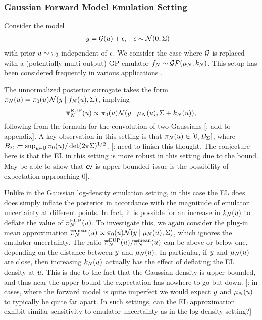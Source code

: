 \documentclass[12pt]{article}
\begin{document}
\subsubsection{Gaussian Forward Model Emulation Setting} \label{sec:fwd-Gaussian} 
Consider the model
\begin{align}
&y = \mathcal{G}(u) + \epsilon, &&\epsilon \sim \mathcal{N}(0, \Sigma)
\end{align}
with prior $u \sim \pi_0$ independent of $\epsilon$. We consider the case 
where $\mathcal{G}$ is replaced with a (potentially multi-output) GP emulator 
$f_{N} \sim \mathcal{GP}(\mu_{N}, k_{N})$. This setup has been considered frequently in various 
applications \citep{Surer2023sequential,weightedIVAR,StuartTeck2,GP_PDE_priors,CES,
idealizedGCM,villani2024posteriorsamplingadaptivegaussian,hydrologicalModel,hydrologicalModel2}.

The unnormalized posterior surrogate takes the form 
$\pi_{N}(u) = \pi_0(u)\mathcal{N}(y \mid f_{N}(u), \Sigma)$, implying
\begin{equation}
\overline{\pi}_{N}^{\mathrm{EUP}}(u) \propto \pi_0(u) \mathcal{N}(y \mid \mu_{N}(u), \Sigma + k_{N}(u)),
\label{eq:EL-Gaussian-fwd}
\end{equation}
following from the formula for the convolution of two Gaussians [\todo: add to appendix].
A key observation in this setting is that $\pi_{N}(u) \in [0, B_{\Sigma}]$, where 
$B_{\Sigma} \coloneqq \sup_{u \in \mathsf{U}} \pi_0(u) / \det(2\pi\Sigma)^{1/2}$.
[\todo: need to finish this thought. The conjecture here is that the EL in this setting is 
more robust in this setting due to the bound. May be able to show that $\mathsf{cv}$ is upper
bounded--issue is the possibility of expectation approaching 0].

Unlike in the Gaussian log-density emulation setting, in this case the EL does does simply 
inflate the posterior in accordance with the magnitude of emulator uncertainty at different points.
In fact, it is possible for an increase in $k_{N}(u)$ to deflate the value of $\overline{\pi}_{N}^{\mathrm{EUP}}(u)$.
To investigate this, we again consider the plug-in mean approximation
$\overline{\pi}_{N}^{\mathrm{mean}}(u) \propto \pi_0(u) \mathcal{N}(y \mid \mu_{N}(u), \Sigma)$,
which ignores the emulator uncertainty. The ratio 
$\overline{\pi}_{N}^{\mathrm{EUP}}(u)/\overline{\pi}_{N}^{\mathrm{mean}}(u)$ can be above 
or below one, depending on the distance between $y$ and $\mu_{N}(u)$. In particular,
if $y$ and $\mu_{N}(u)$ are close, then increasing $k_{N}(u)$ actually has the effect
of deflating the EL density at $u$. This is due to the fact that the Gaussian density is 
upper bounded, and thus near the upper bound the expectation has nowhere to go but down.
[\todo: in cases, where the forward model is quite imperfect we would expect $y$ and $\mu_{N}(u)$
to typically be quite far apart. In such settings, can the EL approximation exhibit similar sensitivity to 
emulator uncertainty as in the log-density setting?]
 
\end{document}
